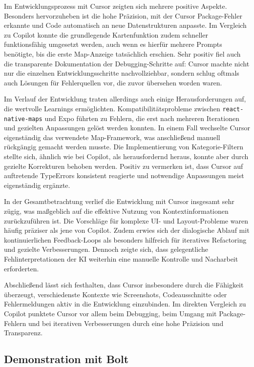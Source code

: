 Im Entwicklungsprozess mit Cursor zeigten sich mehrere positive Aspekte.
Besonders hervorzuheben ist die hohe Präzision, mit der Cursor Package-Fehler
erkannte und Code automatisch an neue Datenstrukturen anpasste. Im Vergleich zu
Copilot konnte die grundlegende Kartenfunktion zudem schneller funktionsfähig
umgesetzt werden, auch wenn es hierfür mehrere Prompts benötigte, bis die erste
Map-Anzeige tatsächlich erschien. Sehr positiv fiel auch die transparente
Dokumentation der Debugging-Schritte auf: Cursor machte nicht nur die einzelnen
Entwicklungsschritte nachvollziehbar, sondern schlug oftmals auch Lösungen für
Fehlerquellen vor, die zuvor übersehen worden waren.

Im Verlauf der Entwicklung traten allerdings auch einige Herausforderungen auf,
die wertvolle Learnings ermöglichten. Kompatibilitätsprobleme zwischen
\texttt{react-native-maps} und Expo führten zu Fehlern, die erst nach mehreren
Iterationen und gezielten Anpassungen gelöst werden konnten. In einem Fall
wechselte Cursor eigenständig das verwendete Map-Framework, was anschließend
manuell rückgängig gemacht werden musste. Die Implementierung von
Kategorie-Filtern stellte sich, ähnlich wie bei Copilot, als herausfordernd
heraus, konnte aber durch gezielte Korrekturen behoben werden. Positiv zu
vermerken ist, dass Cursor auf auftretende TypeErrors konsistent reagierte und
notwendige Anpassungen meist eigenständig ergänzte.

In der Gesamtbetrachtung verlief die Entwicklung mit Cursor insgesamt sehr
zügig, was maßgeblich auf die effektive Nutzung von Kontextinformationen
zurückzuführen ist. Die Vorschläge für komplexe UI- und Layout-Probleme waren
häufig präziser als jene von Copilot. Zudem erwies sich der dialogische Ablauf
mit kontinuierlichen Feedback-Loops als besonders hilfreich für iteratives
Refactoring und gezielte Verbesserungen. Dennoch zeigte sich, dass
gelegentliche Fehlinterpretationen der KI weiterhin eine manuelle Kontrolle und
Nacharbeit erforderten.

Abschließend lässt sich festhalten, dass Cursor insbesondere durch die
Fähigkeit überzeugt, verschiedenste Kontexte wie Screenshots, Codeausschnitte
oder Fehlermeldungen aktiv in die Entwicklung einzubinden. Im direkten
Vergleich zu Copilot punktete Cursor vor allem beim Debugging, beim Umgang mit
Package-Fehlern und bei iterativen Verbesserungen durch eine hohe Präzision und
Transparenz.

\subsection{Demonstration mit Bolt}

